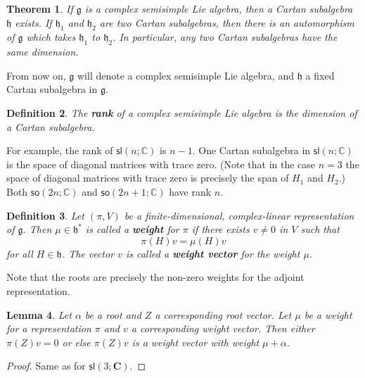 \documentclass{amsbook}
\let \frak = \mathfrak
\theoremstyle{plain}
\newtheorem{theorem}{Theorem}
\newtheorem{definition}[theorem]{Definition}
\newtheorem{lemma}[theorem]{Lemma}
\numberwithin{equation}{chapter}
\numberwithin{theorem}{chapter}
\begin{document}
\begin{theorem}
If $\frak{g}$ is a complex semisimple Lie algebra, then a Cartan subalgebra
$\frak{h}$ exists. If $\frak{h}_{1}$ and $\frak{h}_{2}$ are two Cartan
subalgebras, then there is an automorphism of $\frak{g}$ which takes
$\frak{h}_{1}$ to $\frak{h}_{2}$. In particular, any two Cartan subalgebras
have the same dimension.
\end{theorem}

From now on, $\frak{g}$ will denote a complex semisimple Lie algebra, and
$\frak{h}$ a fixed Cartan subalgebra in $\frak{g}$.

\begin{definition}
The \textbf{rank} of a complex semisimple Lie algebra is the dimension of a
Cartan subalgebra.
\end{definition}

For example, the rank of $\mathsf{sl}\left(  n;\mathbb{C}\right)  $ is $n-1$.
One Cartan subalgebra in $\mathsf{sl}\left(  n;\mathbb{C}\right)  $ is the
space of diagonal matrices with trace zero. (Note that in the case $n=3$ the
space of diagonal matrices with trace zero is precisely the span of $H_{1}$
and $H_{2}$.) Both $\mathsf{so}(2n;\mathbb{C})$ and $\mathsf{so}%
(2n+1;\mathbb{C})$ have rank $n$.

\begin{definition}
Let $\left(  \pi,V\right)  $ be a finite-dimensional, complex-linear
representation of $\frak{g}$. Then $\mu\in\frak{h}^{\ast}$ is called a
\textbf{weight} for $\pi$ if there exists $v\neq0$ in $V$ such that
\[
\pi(H)v=\mu(H)v
\]
for all $H\in\frak{h}$. The vector $v$ is called a \textbf{weight vector} for
the weight $\mu$.
\end{definition}

Note that the roots are precisely the non-zero weights for the adjoint representation.

\begin{lemma}
Let $\alpha$ be a root and $Z$ a corresponding root vector. Let $\mu$ be a
weight for a representation $\pi$ and $v$ a corresponding weight vector. Then
either $\pi(Z)v=0$ or else $\pi(Z)v$ is a weight vector with weight
$\mu+\alpha$.
\end{lemma}

\begin{proof}
Same as for $\mathsf{sl}\left(  3;\mathbf{C}\right)  $.
\end{proof}
\end{document}
